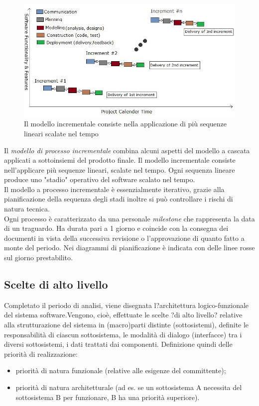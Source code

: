 \documentclass[12pt,a4paper,titlepage]{article}
\begin{document}
		\begin{figure}[h]
			\centering
			\includegraphics[width=1\linewidth]{Incremental-Development}
			\caption[Incremental Development]{Il modello incrementale consiste nella applicazione di più sequenze lineari scalate nel tempo}
			\label{fig:incremental-development}
		\end{figure}
	
		Il \textit{modello di processo incrementale} combina alcuni aspetti del modello a cascata applicati a sottoinsiemi del prodotto finale. Il modello incrementale consiste nell'applicare più sequenze lineari, scalate nel tempo. Ogni sequenza lineare produce uno "stadio" operativo del software scalato nel tempo.\\
		Il modello a processo incrementale è essenzialmente iterativo, grazie alla pianificazione della sequenza degli stadi inoltre si può controllare i rischi di natura tecnica.\\
		Ogni processo è caratterizzato da una personale \textit{milestone} che rappresenta la data di un traguardo. Ha durata pari a 1 giorno e coincide con la consegna dei documenti in vista della successiva revisione o l'approvazione di quanto fatto a monte del periodo. Nei diagrammi di pianificazione è indicata con delle linee rosse sul giorno prestabilito.
		\subsection{Scelte di alto livello}
			Completato il periodo di analisi, viene disegnata l?architettura logico-funzionale del sistema software.Vengono, cioè, effettuate le scelte ?di alto livello? relative alla strutturazione del sistema in (macro)parti distinte (sottosistemi), definite le responsabilità di ciascun sottosistema, le modalità di dialogo (interfacce) tra i diversi sottosistemi, i dati trattati dai componenti.
			Definizione quindi delle priorità di realizzazione:
			\begin{itemize}
				\item priorità di natura funzionale (relative alle esigenze del committente);
				\item priorità di natura architetturale (ad es. se un sottosistema A necessita del sottosistema B per funzionare, B ha una priorità superiore).
			\end{itemize}
		
\end{document}
